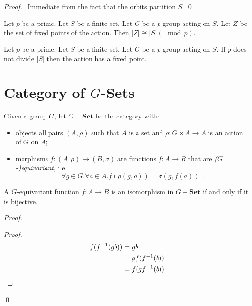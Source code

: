 \begin{proof}
\pf\ Immediate from the fact that the orbits partition $S$. \qed
\end{proof}

\begin{cor}
\label{cor:fixed-points-of-action-of-p-group}
Let $p$ be a prime.
Let $S$ be a finite set. Let $G$ be a $p$-group acting on $S$. Let $Z$ be the set of fixed points of the action. Then $|Z| \cong |S| (\mod p)$.
\end{cor}

\begin{cor}
\label{cor:p-not-divide-fixed-point}
Let $p$ be a prime. Let $S$ be a finite set. Let $G$ be a $p$-group acting on $S$. If $p$ does not divide $|S|$ then the action has a fixed point.
\end{cor}

\section{Category of $G$-Sets}

\begin{df}
Given a group $G$, let $G-\mathbf{Set}$ be the category with:
\begin{itemize}
\item objects all pairs $(A, \rho)$ such that $A$ is a set and $\rho : G \times A \rightarrow A$ is an action of $G$ on $A$;
\item morphisms $f : (A, \rho) \rightarrow (B, \sigma)$ are functions $f : A \rightarrow B$ that are \emph{($G$-)equivariant}, i.e.
\[ \forall g \in G. \forall a \in A. f(\rho(g,a)) = \sigma(g,f(a)) \enspace . \]
\end{itemize}
\end{df}

\begin{prop}
A $G$-equivariant function $f : A \rightarrow B$ is an isomorphism in $G-\mathbf{Set}$ if and only if it is bijective.
\end{prop}

\begin{proof}
\pf
{}
\begin{proof}
\pf
\begin{align*}
f({f}^{-1}(gb)) & = gb \\
& = g f({f}^{-1}(b)) \\
& = f(g {f}^{-1}(b))
\end{align*}
\end{proof}
\qed
\end{proof}

